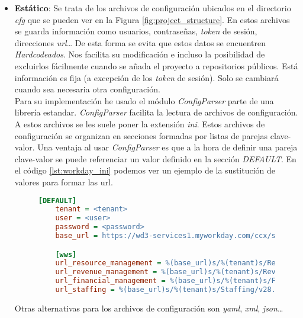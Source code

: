 \begin{itemize}[leftmargin=*]
\item \textbf{Estático}: Se trata de los archivos de configuración ubicados en el directorio \textit{cfg} que se pueden ver en la Figura \ref{fig:project_structure}.
En estos archivos se guarda información como usuarios, contraseñas, \textit{token} de sesión, direcciones \textit{url}\ldots
De esta forma se evita que estos datos se encuentren \textit{Hardcodeados}. Nos facilita su modificación e
incluso la posibilidad de excluirlos fácilmente cuando se añada el proyecto a repositorios públicos.
Está información es fija (a excepción de los \textit{token} de sesión). Solo se cambiará cuando sea necesaria otra configuración.\\

Para su implementación he usado el módulo \textit{ConfigParser} \cite{ConfigParser} parte de una librería estandar. \textit{ConfigParser} facilita la lectura de archivos de configuración. A estos archivos se les suele poner la extensión \textit{ini}.
Estos archivos de configuración se organizan en secciones formadas por listas de parejas clave-valor.
Una ventaja al usar \textit{ConfigParser} es que a la hora de definir una pareja clave-valor se puede referenciar un valor definido en la sección \textit{DEFAULT}. 
En el código \ref{lst:workday_ini} podemos ver un ejemplo de la sustitución de valores para formar las url.

\begin{figure}
\begin{lstlisting}[caption={Archivo de configuración workday.ini},label={lst:workday_ini}, language={INI}, breaklines]
	[DEFAULT]
	tenant = <tenant>
	user = <user>
	password = <password>
	base_url = https://wd3-services1.myworkday.com/ccx/service

	[wws]
	url_resource_management = %(base_url)s/%(tenant)s/Resource_Management/v28.0
	url_revenue_management = %(base_url)s/%(tenant)s/Revenue_Management/v28.0
	url_financial_management = %(base_url)s/%(tenant)s/Financial_Management/v28.0
	url_staffing = %(base_url)s/%(tenant)s/Staffing/v28.0
\end{lstlisting}
\end{figure}


Otras alternativas para los archivos de configuración son \textit{yaml}, \textit{xml}, \textit{json}\ldots



\end{itemize}
